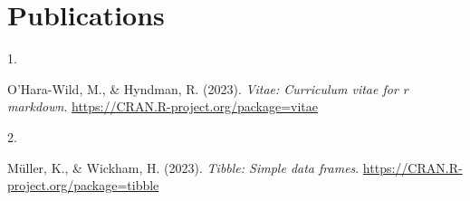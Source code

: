 \documentclass[10pt,a4paper,]{twentysecondcv}
\newlength{\csllabelwidth}
\newcommand{\CSLLeftMargin}[1]{\parbox[t]{\csllabelwidth}{#1}}
\newcommand{\CSLRightInline}[1]{\parbox[t]{\linewidth - \csllabelwidth}{#1}}
\begin{document}
\hypertarget{publications}{%
\section{Publications}\label{publications}}

\hypertarget{bibliography}{}
\leavevmode{}%
\CSLLeftMargin{1. }%
\CSLRightInline{O'Hara-Wild, M., \& Hyndman, R. (2023). \emph{Vitae:
Curriculum vitae for r markdown}.
\url{https://CRAN.R-project.org/package=vitae}}

\leavevmode{}%
\CSLLeftMargin{2. }%
\CSLRightInline{Müller, K., \& Wickham, H. (2023). \emph{Tibble: Simple
data frames}. \url{https://CRAN.R-project.org/package=tibble}}
\end{document}
